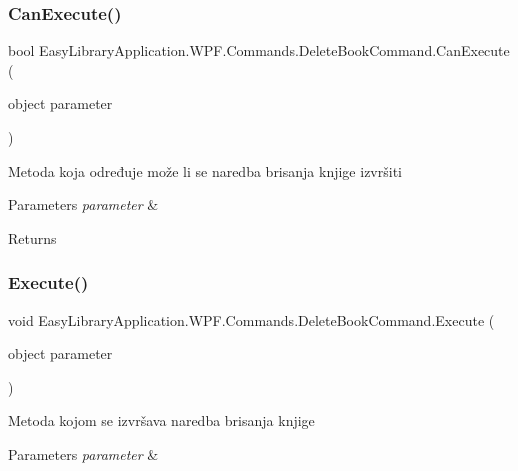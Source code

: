 \subsubsection{\texorpdfstring{Can\+Execute()}{CanExecute()}}
{\footnotesize\ttfamily bool Easy\+Library\+Application.\+W\+P\+F.\+Commands.\+Delete\+Book\+Command.\+Can\+Execute (\begin{DoxyParamCaption}\item[{object}]{parameter }\end{DoxyParamCaption})}



Metoda koja određuje može li se naredba brisanja knjige izvršiti 


\begin{DoxyParams}{Parameters}
{\em parameter} & \\
\hline
\end{DoxyParams}
\begin{DoxyReturn}{Returns}

\end{DoxyReturn}
\mbox{\label{class_easy_library_application_1_1_w_p_f_1_1_commands_1_1_delete_book_command_a1b5411c127da02e63337bdbc367b6dc7}} 
\subsubsection{\texorpdfstring{Execute()}{Execute()}}
{\footnotesize\ttfamily void Easy\+Library\+Application.\+W\+P\+F.\+Commands.\+Delete\+Book\+Command.\+Execute (\begin{DoxyParamCaption}\item[{object}]{parameter }\end{DoxyParamCaption})}



Metoda kojom se izvršava naredba brisanja knjige 


\begin{DoxyParams}{Parameters}
{\em parameter} & \\
\hline
\end{DoxyParams}


